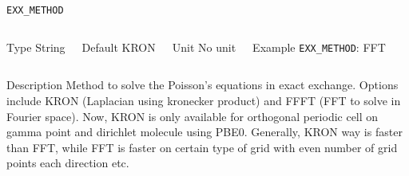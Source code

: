     
    \begin{frame}[allowframebreaks]{\texttt{EXX\_METHOD}} \label{EXX_METHOD}
    \vspace*{-12pt}
    \begin{columns}
    \begin{block}{Type}
    String
    \end{block}
    
    \begin{block}{Default}
    KRON
    \end{block}
    
    \begin{block}{Unit}
    No unit
    \end{block}
    
    \begin{block}{Example}
    \texttt{EXX\_METHOD}: FFT
    \end{block}
    \end{columns}
    
    \begin{block}{Description}
    Method to solve the Poisson's equations in exact exchange. Options include KRON (Laplacian using kronecker product) and FFFT (FFT to solve in Fourier space). Now, KRON is only available for orthogonal periodic cell on gamma point and dirichlet molecule using PBE0. Generally, KRON way is faster than FFT, while FFT is faster on certain type of grid with even number of grid points each direction etc. 
    \end{block}
    
    \end{frame}
    
